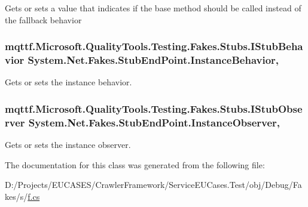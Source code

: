 Gets or sets a value that indicates if the base method should be called instead of the fallback behavior

\hypertarget{class_system_1_1_net_1_1_fakes_1_1_stub_end_point_a50a2b6823c5ab8e5b170ca1c3cf925f5}{
\subsubsection[{Instance\-Behavior}]{\setlength{\rightskip}{0pt plus 5cm}mqttf.\-Microsoft.\-Quality\-Tools.\-Testing.\-Fakes.\-Stubs.\-I\-Stub\-Behavior System.\-Net.\-Fakes.\-Stub\-End\-Point.\-Instance\-Behavior\hspace{0.3cm}{\ttfamily [get]}, {\ttfamily [set]}}}\label{class_system_1_1_net_1_1_fakes_1_1_stub_end_point_a50a2b6823c5ab8e5b170ca1c3cf925f5}


Gets or sets the instance behavior.

\hypertarget{class_system_1_1_net_1_1_fakes_1_1_stub_end_point_a8de72cf51bcf170a7312fda400daae55}{
\subsubsection[{Instance\-Observer}]{\setlength{\rightskip}{0pt plus 5cm}mqttf.\-Microsoft.\-Quality\-Tools.\-Testing.\-Fakes.\-Stubs.\-I\-Stub\-Observer System.\-Net.\-Fakes.\-Stub\-End\-Point.\-Instance\-Observer\hspace{0.3cm}{\ttfamily [get]}, {\ttfamily [set]}}}\label{class_system_1_1_net_1_1_fakes_1_1_stub_end_point_a8de72cf51bcf170a7312fda400daae55}


Gets or sets the instance observer.



The documentation for this class was generated from the following file\-:\begin{DoxyCompactItemize}
\item 
D\-:/\-Projects/\-E\-U\-C\-A\-S\-E\-S/\-Crawler\-Framework/\-Service\-E\-U\-Cases.\-Test/obj/\-Debug/\-Fakes/s/\hyperlink{s_2f_8cs}{f.\-cs}\end{DoxyCompactItemize}
